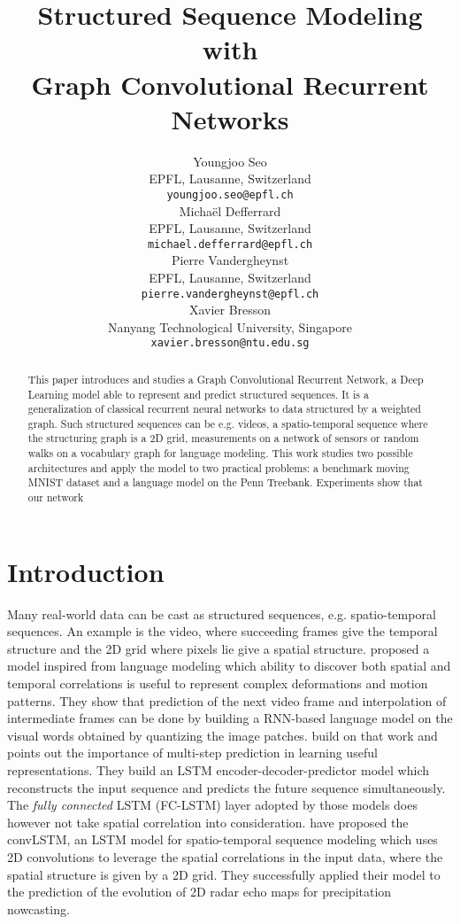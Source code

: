 \documentclass{article} %
\title{Structured Sequence Modeling with \\
Graph Convolutional Recurrent Networks}
\author{Youngjoo Seo \\
EPFL, Lausanne, Switzerland \\
\texttt{youngjoo.seo@epfl.ch} \\
\And
Michaël Defferrard \\
EPFL, Lausanne, Switzerland \\
\texttt{michael.defferrard@epfl.ch} \\
\And
Pierre Vandergheynst \\
EPFL, Lausanne, Switzerland \\
\texttt{pierre.vandergheynst@epfl.ch} \\
\And
Xavier Bresson \\
Nanyang Technological University, Singapore \\
\texttt{xavier.bresson@ntu.edu.sg} \\
}
\newcommand{\todo}[1]{{\color{red} #1 }}
\begin{document}
\maketitle

\begin{abstract}
	This paper introduces and studies a Graph Convolutional Recurrent
	Network, a Deep Learning model able to represent and predict structured
	sequences. It is a generalization of classical recurrent neural networks to
	data structured by a weighted graph.
	Such structured sequences can be e.g. videos, a spatio-temporal sequence
	where the structuring graph is a 2D grid, measurements on a network of
	sensors or random walks on a vocabulary graph for language modeling.
	This work studies two possible architectures and apply the model to two
	practical problems: a benchmark moving MNIST dataset and a language model
	on the Penn Treebank. Experiments \todo{show that our network}
\end{abstract}

\section{Introduction}

Many real-world data can be cast as structured sequences, e.g. spatio-temporal
sequences. An example is the video, where succeeding frames give the temporal
structure and the 2D grid where pixels lie give a spatial structure.
\citet{video_language_model} proposed a model inspired from language modeling
which ability to discover both spatial and temporal correlations is useful to
represent complex deformations and motion patterns. They show that prediction
of the next video frame and interpolation of intermediate frames can be done by
building a RNN-based language model on the visual words obtained by quantizing
the image patches. \citep{moving_mnist} build on that work and points out the
importance of multi-step prediction in learning useful representations. They
build an LSTM encoder-decoder-predictor model which reconstructs the input
sequence and predicts the future sequence simultaneously. The \textit{fully
connected} LSTM (FC-LSTM) layer adopted by those models does however not take
spatial correlation into consideration. \citet{convlstm} have proposed the
convLSTM, an LSTM model for spatio-temporal sequence modeling which uses 2D
convolutions to leverage the spatial correlations in the input data, where the
spatial structure is given by a 2D grid. They successfully applied their model
to the prediction of the evolution of 2D radar echo maps for precipitation
nowcasting.
\end{document}
